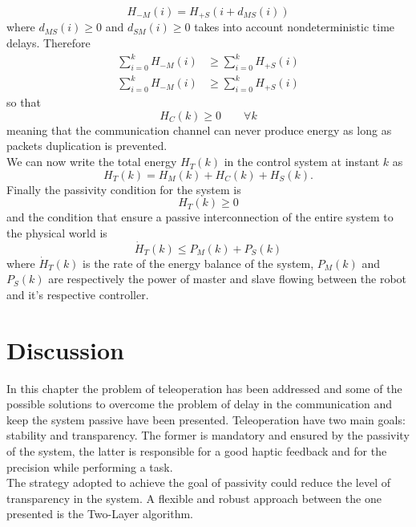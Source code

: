 \begin{equation}
H_{-M}(i) = H_{+S}(i+d_{MS}(i))
\end{equation}
where $d_{MS}(i)\geq 0$ and $d_{SM}(i)\geq 0$ takes into account nondeterministic time delays.
Therefore 
\begin{equation}
	\begin{split}
		\sum_{i=0}^{k} H_{-M}(i) & \geq \sum_{i=0}^{k} H_{+S}(i)\\
		\sum_{i=0}^{k} H_{-M}(i) & \geq \sum_{i=0}^{k} H_{+S}(i)
	\end{split}
\end{equation}
so that
\begin{equation}
H_{C}(k) \geq 0 \qquad \forall k
\end{equation}
meaning that the communication channel can never produce energy as long as packets duplication is prevented.\\
We can now write the total energy $H_{T}(k)$ in the control system at instant $k$ as 
\begin{equation}
	H_{T}(k) = H_{M}(k) + H_{C}(k) + H_{S}(k).
\end{equation}
Finally the passivity condition for the system is 
\begin{equation}
H_{T}(k) \geq 0
\end{equation}
and the condition that ensure a passive interconnection of the entire system to the physical world is
\begin{equation}\label{Two_layer_passivity_world}
	\dot{H}_{T}(k)\leq P_{M}(k) + P_{S}(k)
\end{equation}
where $\dot{H}_{T}(k)$ is the rate of the energy balance of the system, $P_{M}(k)$ and $P_{S}(k)$ are respectively the power of master and slave flowing between the robot and it's respective controller.

\section{Discussion}
In this chapter the problem of teleoperation has been addressed and some of the possible solutions to overcome the problem of delay in the communication and keep the system passive have been presented.
Teleoperation have two main goals: stability and transparency. The former is mandatory and ensured by the passivity of the system, the latter is responsible for a good haptic feedback and for the precision while performing a task.\\
The strategy adopted to achieve the goal of passivity could reduce the level of transparency in the system. A flexible and robust approach between the one presented is the Two-Layer algorithm. 


\clearpage
\thispagestyle{empty}